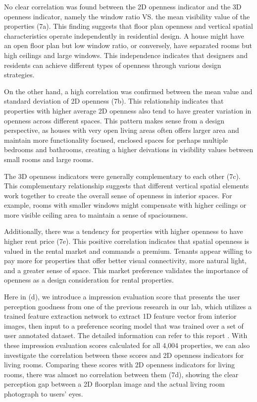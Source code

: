 No clear correlation was found between the 2D openness indicator and the 3D openness indicator, namely the window ratio VS.
the mean visibility value of the properties (7a). This finding suggests that floor plan openness and vertical spatial characteristics 
operate independently in residential design. A house might have an open floor plan but low window ratio, 
or conversely, have separated rooms but high ceilings and large windows. This independence indicates 
that designers and residents can achieve different types of openness through various design 
strategies.

On the other hand, a high correlation was confirmed between the mean value and standard deviation of 
2D openness (7b). This relationship indicates that properties with higher average 2D openness 
also tend to have greater variation in openness across different spaces. This pattern makes sense 
from a design perspective, as houses with very open living areas often offers larger area and maintain more functionality focused, 
enclosed spaces for perhaps multiple bedrooms and bathrooms, creating a higher deivations in visibility values between small rooms
and large rooms.

The 3D openness indicators were generally complementary to each other (7c). This 
complementary relationship suggests that different vertical spatial elements work together to create 
the overall sense of openness in interior spaces. For example, rooms with smaller windows might 
compensate with higher ceilings or more visible ceiling area to maintain a sense of spaciousness.

Additionally, there was a tendency for properties with higher openness to have higher rent price (7e). 
This positive correlation indicates that spatial openness is valued in the rental market and 
commands a premium. Tenants appear willing to pay more for properties that offer better visual 
connectivity, more natural light, and a greater sense of space. This market preference validates the 
importance of openness as a design consideration for rental properties.

Here in (d), we introduce a impression evaluation score that presents the user perception goodness from one of the 
previous research in our lab, which utilizes a trained feature extraction network to extract 1D feature 
vector from interior images, then input to a preference scoring model that was trained over a set of user annotated dataset. 
The detailed information can refer to this report \cite{oki2023rental}. With these impression evaluation scores calculated for all 4,004 
properties, we can also investigate the correlation between these scores and 2D openness indicators for living rooms. 
Comparing these scores with 2D openness indicators for living rooms, there was almost no correlation between them (7d), showing
the clear perception gap between a 2D floorplan image and the actual living room photograph to users' eyes. 

